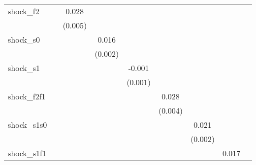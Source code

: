 {\begin{tabular}{l*{8}{c}}
\addlinespace
shock\_f2    &                     &       0.028\sym{***}&                     &                     &                     &                     &                     &                     \\
            &                     &     (0.005)         &                     &                     &                     &                     &                     &                     \\
\addlinespace
shock\_s0    &                     &                     &       0.016\sym{***}&                     &                     &                     &                     &                     \\
            &                     &                     &     (0.002)         &                     &                     &                     &                     &                     \\
\addlinespace
shock\_s1    &                     &                     &                     &      -0.001         &                     &                     &                     &                     \\
            &                     &                     &                     &     (0.001)         &                     &                     &                     &                     \\
\addlinespace
shock\_f2f1  &                     &                     &                     &                     &       0.028\sym{***}&                     &                     &                     \\
            &                     &                     &                     &                     &     (0.004)         &                     &                     &                     \\
\addlinespace
shock\_s1s0  &                     &                     &                     &                     &                     &       0.021\sym{***}&                     &                     \\
            &                     &                     &                     &                     &                     &     (0.002)         &                     &                     \\
\addlinespace
shock\_s1f1  &                     &                     &                     &                     &                     &                     &       0.017\sym{***}&                     \\

\end{tabular}}
